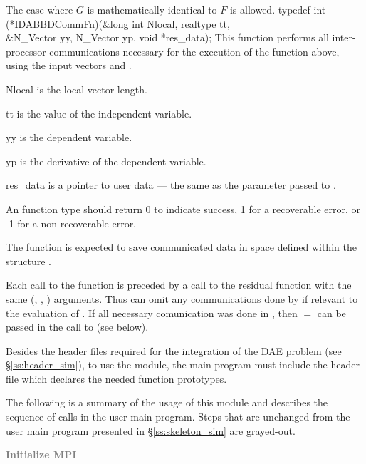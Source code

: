 {{  The case where $G$ is mathematically identical to $F$ is allowed.
}
{
  typedef int (*IDABBDCommFn)(&long int Nlocal, realtype tt,  \\
                               &N\_Vector yy, N\_Vector yp, void *res\_data);
}
{
  This function performs all inter-processor communications necessary 
  for the execution of the  function above, using the input 
  vectors  and .
}
{
  \begin{args}
  \item[Nlocal] 
    is the local vector length.
  \item[tt]
    is the value of the independent variable.
  \item[yy]
    is the dependent variable. 
  \item[yp]
    is the derivative of the dependent variable. 
  \item[res\_data]
    is a pointer to user data --- the same as the       
    parameter passed to .  
  \end{args}
}
{
  An  function type should return 0 to indicate success,
  1 for a recoverable error, or -1 for a non-recoverable error.
}
{
  The  function is expected to save communicated data in space defined
  within the structure . 

  Each call to the  function is preceded by a call to the residual
  function  with the same (, , ) arguments.  
  Thus  can omit any communications done by  if relevant to the 
  evaluation of .  
  If all necessary comunication was done in , then  $=$ 
  can be passed in the call to  (see below).

}


Besides the header files required for the integration of the DAE problem
(see \S\ref{ss:header_sim}),  to use the {\idabbdpre} module, the main program 
must include the header file  which declares the needed
function prototypes.

The following is a summary of the usage of this module and describes the sequence 
of calls in the user main program. Steps that are unchanged from the user main
program presented in \S\ref{ss:skeleton_sim} are grayed-out.
\begin{Steps}
\item 
  \textcolor{gray}{\bf Initialize MPI}


\end{Steps}}
